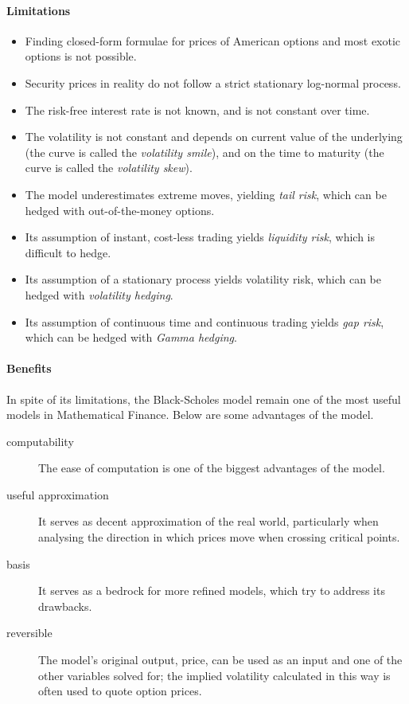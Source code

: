 \paragraph{Limitations}
\begin{itemize}
	\item Finding closed-form formulae for prices of American options and most exotic options is not possible.
	\item Security prices in reality do not follow a strict stationary log-normal process.
	\item The risk-free interest rate is not known, and is not constant over time.
	\item The volatility is not constant and depends on current value of the underlying (the curve is called the \emph{volatility smile}), and on the time to maturity (the curve is called the \emph{volatility skew}).
	\item The model underestimates extreme moves, yielding \emph{tail risk}, which can be hedged with out-of-the-money options.
	\item Its assumption of instant, cost-less trading yields \emph{liquidity risk}, which is difficult to hedge.
	\item Its assumption of a stationary process yields volatility risk, which can be hedged with \emph{volatility hedging}.
	\item Its assumption of continuous time and continuous trading yields \emph{gap risk}, which can be hedged with \emph{Gamma hedging}.
\end{itemize}


\paragraph{Benefits}
In spite of its limitations, the Black-Scholes model remain one of the most useful models in Mathematical Finance. Below are some advantages of the model.
\begin{description}
	\item[computability] The ease of computation is one of the biggest advantages of the model.
	\item[useful approximation] It serves as decent approximation of the real world, particularly when analysing the direction in which prices move when crossing critical points.
	\item[basis] It serves as a bedrock for more refined models, which try to address its drawbacks.
	\item[reversible] The model's original output, price, can be used as an input and one of the other variables solved for; the implied volatility calculated in this way is often used to quote option prices.
\end{description}



